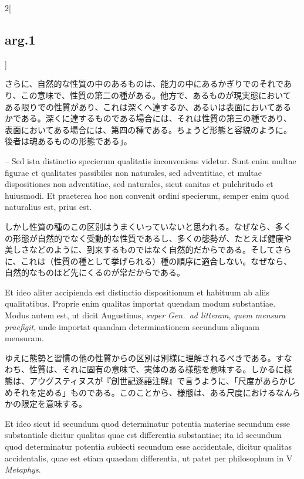 \documentclass[paper=a4paper,fontsize=10pt,jafontsize=9pt,titlepage]{jlreq}
\begin{document}
\begin{paracol}{2}[\subsection{arg.1}]
\switchcolumn

さらに、自然的な性質の中のあるものは、能力の中にあるかぎりでのそれであ
り、この意味で、性質の第二の種がある。他方で、あるものが現実態において
ある限りでの性質があり、これは深くへ達するか、あるいは表面においてある
かである。深くに達するものである場合には、それは性質の第三の種であり、
表面においてある場合には、第四の種である。ちょうど形態と容貌のように。
後者は魂あるものの形態である」。

\switchcolumn*

-- Sed ista distinctio specierum qualitatis
inconveniens videtur. Sunt enim multae figurae et qualitates
passibiles non naturales, sed adventitiae, et multae dispositiones non
adventitiae, sed naturales, sicut sanitas et pulchritudo et
huiusmodi. 
Et praeterea hoc non convenit ordini specierum, semper enim
quod naturalius est, prius est.

\switchcolumn

しかし性質の種のこの区別はうまくいっていないと思われる。なぜなら、多く
の形態が自然的でなく受動的な性質であるし、多くの態勢が、たとえば健康や
美しさなどのように、到来するものではなく自然的だからである。そしてさら
に、これは（性質の種として挙げられる）種の順序に適合しない。なぜなら、
自然的なものほど先にくるのが常だからである。

\switchcolumn*

Et ideo aliter accipienda est
distinctio dispositionum et habituum ab aliis qualitatibus. Proprie
enim qualitas importat quendam modum substantiae. Modus autem est, ut
dicit Augustinus, {\itshape super Gen.~ad litteram}, {\itshape quem mensura praefigit}, unde
importat quandam determinationem secundum aliquam mensuram.

\switchcolumn

ゆえに態勢と習慣の他の性質からの区別は別様に理解されるべきである。すな
わち、性質は、それに固有の意味で、実体のある様態を意味する。しかるに様
態は、アウグスティヌスが『創世記逐語注解』で言うように、「尺度があらかじ
めそれを定める」ものである。このことから、様態は、ある尺度におけるなんら
かの限定を意味する。

\switchcolumn*

Et ideo
sicut id secundum quod determinatur potentia materiae secundum esse
substantiale dicitur qualitas quae est differentia substantiae; ita id
secundum quod determinatur potentia subiecti secundum esse
accidentale, dicitur qualitas accidentalis, quae est etiam quaedam
differentia, ut patet per philosophum in V {\itshape Metaphys}.


\end{paracol}
\end{document}
